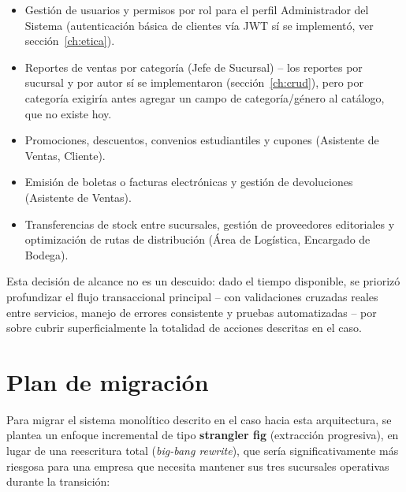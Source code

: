 \begin{itemize}
    \item Gestión de usuarios y permisos por rol para el perfil Administrador del
    Sistema (autenticación básica de clientes vía JWT sí se implementó, ver
    sección~\ref{ch:etica}).
    \item Reportes de ventas por categoría (Jefe de Sucursal) -- los reportes por
    sucursal y por autor sí se implementaron (sección~\ref{ch:crud}), pero por
    categoría exigiría antes agregar un campo de categoría/género al catálogo, que
    no existe hoy.
    \item Promociones, descuentos, convenios estudiantiles y cupones (Asistente de
    Ventas, Cliente).
    \item Emisión de boletas o facturas electrónicas y gestión de devoluciones
    (Asistente de Ventas).
    \item Transferencias de stock entre sucursales, gestión de proveedores editoriales
    y optimización de rutas de distribución (Área de Logística, Encargado de Bodega).
\end{itemize}

Esta decisión de alcance no es un descuido: dado el tiempo disponible, se priorizó
profundizar el flujo transaccional principal -- con validaciones cruzadas reales entre
servicios, manejo de errores consistente y pruebas automatizadas -- por sobre cubrir
superficialmente la totalidad de acciones descritas en el caso.

\section{Plan de migración}

Para migrar el sistema monolítico descrito en el caso hacia esta arquitectura, se
plantea un enfoque incremental de tipo \textbf{strangler fig} (extracción progresiva),
en lugar de una reescritura total (\textit{big-bang rewrite}), que sería
significativamente más riesgosa para una empresa que necesita mantener sus tres
sucursales operativas durante la transición:

